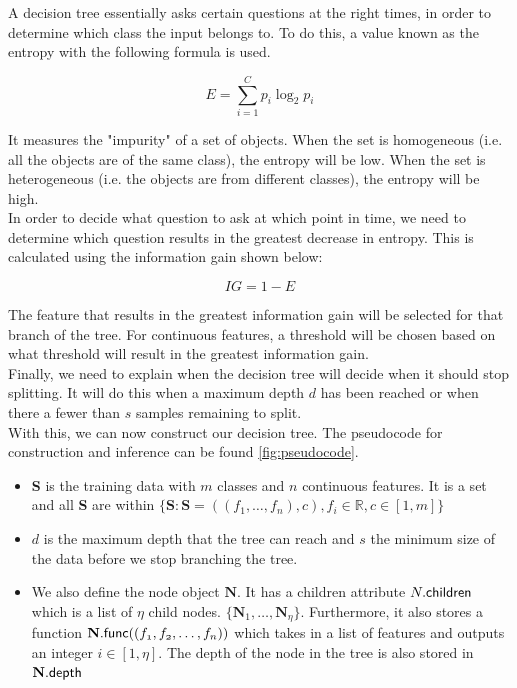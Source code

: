 

 A decision tree essentially asks certain questions at the right times, in order to determine which class the input belongs to. To do this, a value known as the entropy with the following formula is used.

$$E = \sum_{i=1}^{C}p_i\log_2 p_i$$

It measures the "impurity" of a set of objects. When the set is homogeneous (i.e. all the objects are of the same class), the entropy will be low. When the set is heterogeneous (i.e. the objects are from different classes), the entropy will be high. \\

 In order to decide what question to ask at which point in time, we need to determine which question results in the greatest decrease in entropy. This is calculated using the information gain shown below:

$$IG = 1 - E$$

The feature that results in the greatest information gain will be selected for that branch of the tree. For continuous features, a threshold will be chosen based on what threshold will result in the greatest information gain. \\

Finally, we need to explain when the decision tree will decide when it should stop splitting. It will do this when a maximum depth $d$ has been reached or when there a fewer than $s$ samples remaining to split. \\

 With this, we can now construct our decision tree. The pseudocode for construction and inference can be found \ref{fig:pseudocode}.
\begin{itemize}
	\item \textbf{S} is the training data with $m$ classes and $n$ continuous features. It is a set and all \textbf{S} are within $\{\textbf{S} : \textbf{S} = {((f_1,\dots,f_n),c),f_i\in\mathbb{R},c\in [1,m]}\}$
	\item $d$ is the maximum depth that the tree can reach and $s$ the minimum size of the data before we stop branching the tree.
	\item We also define the node object $\textbf{N}$. It has a children attribute $N.\sf{children}$ which is a list of $\eta$ child nodes. $\{\textbf{N}_1,\dots,\textbf{N}_\eta\}$. Furthermore, it also stores a function $\textbf{N}.\sf{func}(\mathnormal{(f_1,f_2,\dots,f_n)})$ which takes in a list of features and outputs an integer $i\in[1,\eta]$. The depth of the node in the tree is also stored in $\textbf{N}.\sf{depth}$
\end{itemize}

